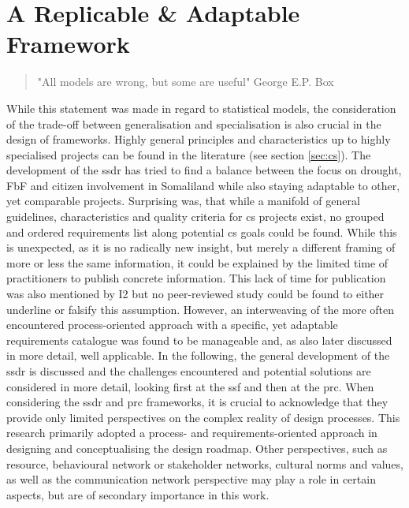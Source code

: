 \section{A Replicable \& Adaptable Framework}
\vspace{\baselineskip}
\begin{quote}
    "All models are wrong, but some are useful" George E.P. Box
\end{quote}
\vspace{\baselineskip}
While this statement was made in regard to statistical models, the consideration of the trade-off between generalisation and specialisation is also crucial in the design of frameworks. Highly general principles and characteristics up to highly specialised projects can be found in the literature (see section \ref{sec:cs}). The development of the \acrshort{ssdr} has tried to find a balance between the focus on drought, FbF and citizen involvement in Somaliland while also staying adaptable to other, yet comparable projects.\newline
Surprising was, that while a manifold of general guidelines, characteristics and quality criteria for \acrlong{cs} projects exist, no grouped and ordered requirements list along potential \acrshort{cs} goals could be found. While this is unexpected, as it is no radically new insight, but merely a different framing of more or less the same information, it could be explained by the limited time of practitioners to publish concrete information. This lack of time for publication was also mentioned by I2 but no peer-reviewed study could be found to either underline or falsify this assumption. However, an interweaving of the more often encountered process-oriented approach with a specific, yet adaptable requirements catalogue was found to be manageable and, as also later discussed in more detail, well applicable.\newline
In the following, the general development of the \acrshort{ssdr} is discussed and the challenges encountered and potential solutions are considered in more detail, looking first at the \acrshort{ssf} and then at the \acrshort{prc}. When considering the \acrshort{ssdr} and \acrshort{prc} frameworks, it is crucial to acknowledge that they provide only limited perspectives on the complex reality of design processes. This research primarily adopted a process- and requirements-oriented approach in designing and conceptualising the design roadmap. Other perspectives, such as resource, behavioural network or stakeholder networks, cultural norms and values, as well as the communication network perspective may play a role in certain aspects, but are of secondary importance in this work.\newline
